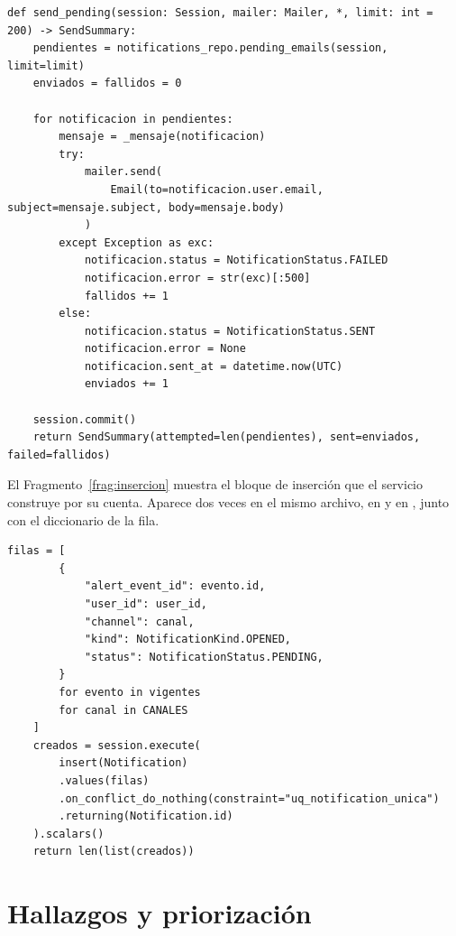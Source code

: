 \documentclass[11pt,a4paper]{article}
\begin{document}
\begin{lstlisting}[float=htbp,caption={\ev{E-05}. Envío en el diseño actual (\cod{notification\_service.py}, líneas 153--179, sin la cadena de documentación).},label=frag:envio]
def send_pending(session: Session, mailer: Mailer, *, limit: int = 200) -> SendSummary:
    pendientes = notifications_repo.pending_emails(session, limit=limit)
    enviados = fallidos = 0

    for notificacion in pendientes:
        mensaje = _mensaje(notificacion)
        try:
            mailer.send(
                Email(to=notificacion.user.email, subject=mensaje.subject, body=mensaje.body)
            )
        except Exception as exc:
            notificacion.status = NotificationStatus.FAILED
            notificacion.error = str(exc)[:500]
            fallidos += 1
        else:
            notificacion.status = NotificationStatus.SENT
            notificacion.error = None
            notificacion.sent_at = datetime.now(UTC)
            enviados += 1

    session.commit()
    return SendSummary(attempted=len(pendientes), sent=enviados, failed=fallidos)
\end{lstlisting}

El Fragmento~\ref{frag:insercion} muestra el bloque de inserción que el servicio construye por su cuenta. Aparece dos veces en el mismo archivo, en  y en , junto con el diccionario de la fila.

\begin{lstlisting}[float=htbp,caption={\ev{E-05}. SQL construido en el servicio y duplicado (\cod{notification\_service.py}, líneas 114--131; el mismo bloque está en las líneas 71--90).},label=frag:insercion]
    filas = [
        {
            "alert_event_id": evento.id,
            "user_id": user_id,
            "channel": canal,
            "kind": NotificationKind.OPENED,
            "status": NotificationStatus.PENDING,
        }
        for evento in vigentes
        for canal in CANALES
    ]
    creados = session.execute(
        insert(Notification)
        .values(filas)
        .on_conflict_do_nothing(constraint="uq_notification_unica")
        .returning(Notification.id)
    ).scalars()
    return len(list(creados))
\end{lstlisting}

\section{Hallazgos y priorización}
\end{document}
